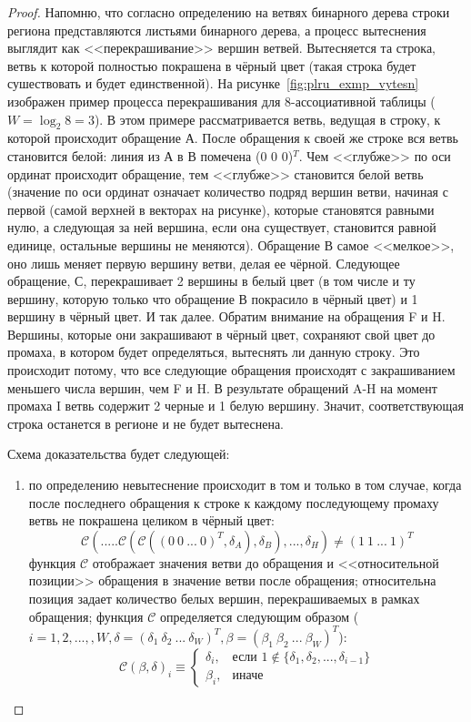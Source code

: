 \begin{theorem}\label{PLRUusefulThm}
\PLRUusefuls
\end{theorem}
\begin{proof}
  Напомню, что согласно определению на ветвях бинарного дерева строки региона представляются листьями бинарного дерева, а  процесс вытеснения выглядит как <<перекрашивание>> вершин ветвей. Вытесняется та строка, ветвь к которой полностью покрашена в чёрный цвет (такая строка будет сушествовать и будет единственной). На рисунке~\ref{fig:plru_exmp_vytesn} изображен пример процесса перекрашивания для 8-ассоциативной таблицы ($W = \log_2 8 = 3$). В этом примере рассматривается ветвь, ведущая в строку, к которой происходит обращение А. После обращения к своей же строке вся ветвь становится белой: линия из А в В помечена (0 0 0)$^T$. Чем <<глубже>> по оси ординат происходит обращение, тем <<глубже>> становится белой ветвь (значение по оси ординат означает количество подряд вершин ветви, начиная с первой (самой верхней в векторах на рисунке), которые становятся равными нулю, а следующая за ней вершина, если она существует, становится равной единице, остальные вершины не меняются). Обращение В самое <<мелкое>>, оно лишь меняет первую вершину ветви, делая ее чёрной. Следующее обращение, С, перекрашивает 2 вершины в белый цвет (в том числе и ту вершину, которую только что обращение В покрасило в чёрный цвет) и 1 вершину в чёрный цвет. И так далее. Обратим внимание на обращения F и H. Вершины, которые они закрашивают в чёрный цвет, сохраняют свой цвет до промаха, в котором будет определяться, вытеснять ли данную строку. Это происходит потому, что все следующие обращения происходят с закрашиванием меньшего числа вершин, чем F и H. В результате обращений A-H на момент промаха I ветвь содержит 2 черные и 1 белую вершину. Значит, соответствующая строка останется в регионе и не будет вытеснена.

  Схема доказательства будет следующей:
  \begin{enumerate}
    \item по определению \PseudoLRU невытеснение происходит в том и только в том случае, когда после последнего обращения к строке к каждому последующему промаху ветвь не покрашена целиком в чёрный цвет:
        \begin{equation}\label{eq:v}
        \mathcal{C}(.....\mathcal{C}(\mathcal{C}( (0~0~...~0)^T, \delta_A), \delta_B), ..., \delta_H) \neq (1~1~...~1)^T
        \end{equation}
        функция $\mathcal{C}$ отображает значения ветви до обращения и <<относительной позиции>> обращения в значение ветви после обращения; относительна позиция задает количество белых вершин, перекрашиваемых в рамках обращения;
        функция $\mathcal{C}$ определяется следующим образом ($i = 1, 2, ..., , W, \delta = (\delta_1~\delta_2~...~\delta_W)^T, \beta = (\beta_1~\beta_2~...~\beta_W)^T$):
        $$\mathcal{C}(\beta, \delta)_i \equiv \begin{cases}\delta_i , & \text{если $1 \notin \{\delta_1, \delta_2, ..., \delta_{i-1}\}$}\\ \beta_i, &\text{иначе}\end{cases}$$
        

\end{enumerate}
\end{proof}
